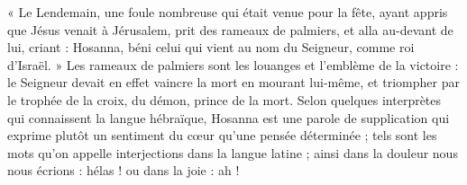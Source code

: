  « Le Lendemain, une foule nombreuse qui était venue pour la fête, ayant appris que Jésus venait à Jérusalem, prit des rameaux de palmiers, et alla au-devant de lui, criant : Hosanna, béni celui qui vient au nom du Seigneur, comme roi d’Israël. » Les rameaux de palmiers sont les louanges et l’emblème de la victoire : le Seigneur devait en effet vaincre la mort en mourant lui-même, et triompher par le trophée de la croix, du démon, prince de la mort. Selon quelques interprètes qui connaissent la langue hébraïque, Hosanna est une parole de supplication qui exprime plutôt un sentiment du cœur qu’une pensée déterminée ; tels sont les mots qu’on appelle interjections dans la langue latine ; ainsi dans la douleur nous nous écrions : hélas ! ou dans la joie : ah !